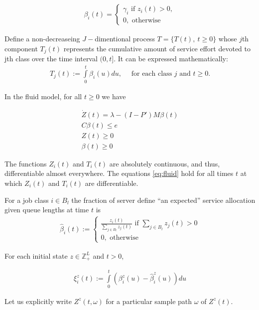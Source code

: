 \documentclass[11pt]{article}
\newcommand{\Z}{\mathbb{Z}}
\theoremstyle{definition}
\numberwithin{equation}{section}
\begin{document}
\begin{align}
\beta_i(t) = 
\begin{cases}
\gamma_i \text{ if }z_i(t)>0,\\
0, \text{ otherwise}
\end{cases}
\end{align}

Define a non-decreaseing $J-$dimentional process $T  = \{T(t), ~t\geq 0\}$ whose $j$th component $T_j(t)$ represents the cumulative amount of service effort devoted to jth class over the time interval $(0, t].$ It can be expressed mathematically:
\begin{align}
T_j(t):=\int\limits_0^t \beta_i(u)du,\quad \text{ for each class } j\text{ and } t\geq 0.
\end{align}


In the fluid model, for all $t\geq 0$ we have


\begin{align}\label{eq:fluid}
\dot Z(t) = \lambda - (I-P')M\beta(t)\\
C\beta(t)\leq e\\
Z(t)\geq 0\\
\beta(t)\geq 0
\end{align}


The functions $Z_i(t)$ and $T_i(t)$ are absolutely continuous, and thus, differentiable almost everywhere. The equations \ref{eq:fluid} hold for all times $t$ at which $Z_i(t)$ and $T_i(t)$ are differentiable.


For a job class $i\in B_l$ the fraction of server define ``an expected'' service allocation given queue lengths at time $t$ is
   \begin{align}
   \hat \beta_i(t) := 
   \begin{cases} 
   \frac{z_i(t)}{\sum\limits_{j\in B_l} z_j(t)} \text{ if } \sum\limits_{j\in B_l} z_j(t)>0\\
   0, \text{ otherwise}
   \end{cases}
   \end{align} 

  
  
  
  For each initial state $z\in \Z_+^L$ and $t > 0 $, 
  
  \begin{align}
  \xi_i^z(t) := \int \limits_{0}^t ( \beta_i^z(u)  - \hat \beta_i^z(u)) du
  \end{align} 

Let us explicitly write $Z^z(t, \omega)$ for a particular sample path $\omega$ of $Z^z(t).$
\end{document}
